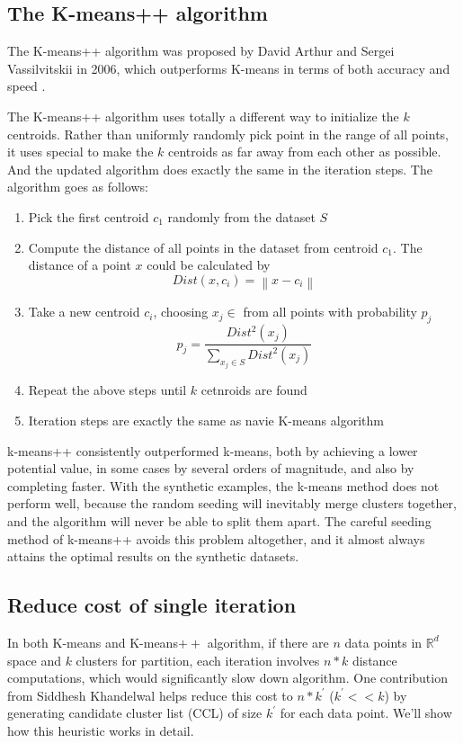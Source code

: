 \documentclass[11pt]{article}
\begin{document}
\subsection{The K-means++ algorithm}
The K-means++ algorithm was proposed by David Arthur and Sergei Vassilvitskii in 2006, which outperforms K-means in terms of both accuracy and speed \cite{kmeanspp}.
\par The K-means++ algorithm uses totally a different way to initialize the $k$ centroids. Rather than uniformly randomly pick point in the range of all points, it uses special to make the $k$ centroids as far away from each other as possible.
And the updated algorithm does exactly the same in the iteration steps. The algorithm goes as follows:
\begin{enumerate}
  \item Pick the first centroid $c_1$ randomly from the dataset $S$
  \item Compute the distance of all points in the dataset from centroid $c_1$. The distance of a point $x$ could be calculated by $$ Dist(x, c_i) = {\left\lVert x-c_i\right\rVert } $$
  \item Take a new centroid $c_i$, choosing $x_j \in $ from all points with probability $p_j$ $$p_j = \frac{Dist^2(x_j)}{\sum_{x_j \in S} Dist^2(x_j)} $$
  \item Repeat the above steps until $k$ cetnroids are found
  \item Iteration steps are exactly the same as navie K-means algorithm
\end{enumerate}
\par k-means++ consistently outperformed k-means, both by achieving a lower potential value,
in some cases by several orders of magnitude, and also by completing faster. With the synthetic
examples, the k-means method does not perform well, because the random seeding will inevitably
merge clusters together, and the algorithm will never be able to split them apart. The careful
seeding method of k-means++ avoids this problem altogether, and it almost always attains the
optimal results on the synthetic datasets.\cite{kmeanspp}

\subsection{Reduce cost of single iteration}
In both K-means and K-means$++$ algorithm, if there are $n$ data points in $\mathbb{R}^ d$ space and $k$ clusters for partition, each iteration involves $n * k$ distance computations, which would significantly slow down algorithm. One contribution from Siddhesh Khandelwal\cite{Faster} helps reduce this cost to $n * k^{\prime}$ ($k^{\prime} << k$) by generating candidate cluster list (CCL) of size $k^{\prime}$ for each data point. We'll show how this heuristic works in detail.
\end{document}
